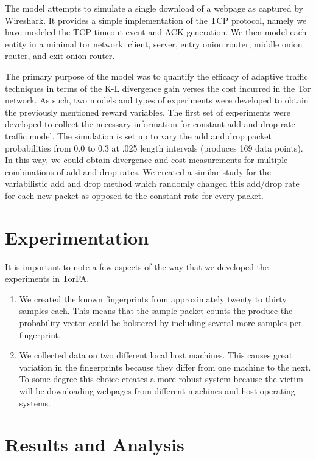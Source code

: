 \documentclass{usenixsubmit}
\begin{document}
The model attempts to simulate a single download of a webpage as captured by 
Wireshark. It provides a simple implementation of the TCP protocol, namely
we have modeled the TCP timeout event and ACK generation. We then model each
entity in a minimal tor network: client, server, entry onion router, middle
onion router, and exit onion router. 

The primary purpose of the model was to quantify the efficacy of adaptive 
traffic techniques 
in terms of the K-L divergence gain verses the cost incurred in the Tor 
network. As such, two models and types of experiments were developed to obtain 
the previously mentioned reward variables. The first set of experiments were 
developed to collect the necessary information for constant add and drop rate
traffic model. The simulation is set up to vary the add and drop packet 
probabilities from 0.0 to 0.3 at .025 length intervals (produces 169 data 
points). In this way, we could 
obtain divergence and cost measurements for multiple combinations of add and 
drop rates. We created a similar study for the variabilistic add and drop 
method which randomly changed this add/drop rate for each new packet as 
opposed to the constant rate for every packet. 

\section{Experimentation}
It is important to note a few aspects of the way that we developed the 
experiments in TorFA. 
\begin{enumerate}
	\item We created the known fingerprints from approximately twenty to 
		thirty samples each. This means that the sample packet counts the 
		produce the probability vector could be bolstered by including several 
		more samples per fingerprint. 
	\item We collected data on two different local host machines. This causes
		great variation in the fingerprints because they differ from one machine
		to the next. To some degree this choice creates a more robust system
		because the victim will be downloading webpages from different machines 
		and host operating systems. 
\end{enumerate}

\section{Results and Analysis}
\end{document}

